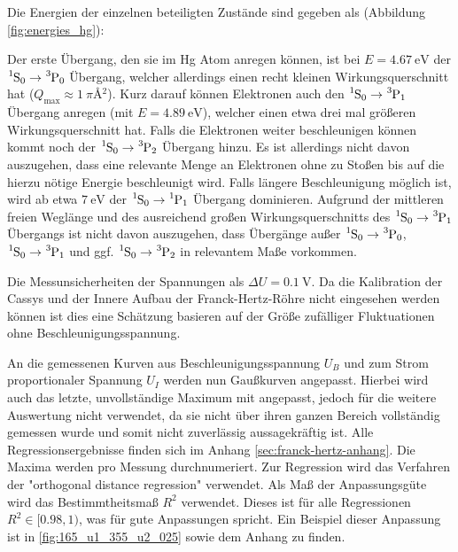 Die Energien der einzelnen beteiligten Zustände sind gegeben als (Abbildung \ref{fig:energies_hg}):


Der erste Übergang, den sie im Hg Atom anregen können, ist bei $E = \SI{4.67}{\electronvolt}$ der $\ce{^1S_0} \rightarrow \ce{^3P_0}$ Übergang, welcher allerdings einen recht kleinen Wirkungsquerschnitt hat ($Q_{\text{max}} \approx \SI{1}{\pi \angstrom^2}$). Kurz darauf können Elektronen auch den $\ce{^1S_0} \rightarrow \ce{^3P_1}$ Übergang anregen (mit $E = \SI{4.89}{\electronvolt}$), welcher einen etwa drei mal größeren Wirkungsquerschnitt hat. Falls die Elektronen weiter beschleunigen können kommt noch der  $\ce{^1S_0} \rightarrow \ce{^3P_2}$ Übergang hinzu. Es ist allerdings nicht davon auszugehen, dass eine relevante Menge an Elektronen ohne zu Stoßen bis auf die hierzu nötige Energie beschleunigt wird. Falls längere Beschleunigung möglich ist, wird ab etwa $\SI{7}{\electronvolt}$ der  $\ce{^1S_0} \rightarrow \ce{^1P_1}$ Übergang dominieren. Aufgrund der mittleren freien Weglänge und des ausreichend großen Wirkungsquerschnitts des  $\ce{^1S_0} \rightarrow \ce{^3P_1}$ Übergangs ist nicht davon auszugehen, dass Übergänge außer  $\ce{^1S_0} \rightarrow \ce{^3P_0}$, $\ce{^1S_0} \rightarrow \ce{^3P_1}$ und ggf. $\ce{^1S_0} \rightarrow \ce{^3P_2}$ in relevantem Maße vorkommen.

Die Messunsicherheiten der Spannungen als $\Delta U = \SI{0.1}{\volt}$. Da die Kalibration der Cassys und der Innere Aufbau der Franck-Hertz-Röhre nicht eingesehen werden können ist dies eine Schätzung basieren auf der Größe zufälliger Fluktuationen ohne Beschleunigungsspannung.

An die gemessenen Kurven aus Beschleunigungsspannung $U_B$ und zum Strom proportionaler Spannung $U_I$ werden nun Gaußkurven angepasst. Hierbei wird auch das letzte, unvollständige Maximum mit angepasst, jedoch für die weitere Auswertung nicht verwendet, da sie nicht über ihren ganzen Bereich vollständig gemessen wurde und somit nicht zuverlässig aussagekräftig ist. Alle Regressionsergebnisse finden sich im Anhang \ref{sec:franck-hertz-anhang}. Die Maxima werden pro Messung durchnumeriert. Zur Regression wird das Verfahren der "orthogonal distance regression" \cite{odr} verwendet. Als Maß der Anpassungsgüte wird das Bestimmtheitsmaß  $R^2$ verwendet\cite{rsquared}. Dieses ist für alle Regressionen $R^2 \in [0.98, 1)$, was für gute Anpassungen spricht. Ein Beispiel dieser Anpassung ist in \ref{fig:165_u1_355_u2_025} sowie dem Anhang zu finden.

